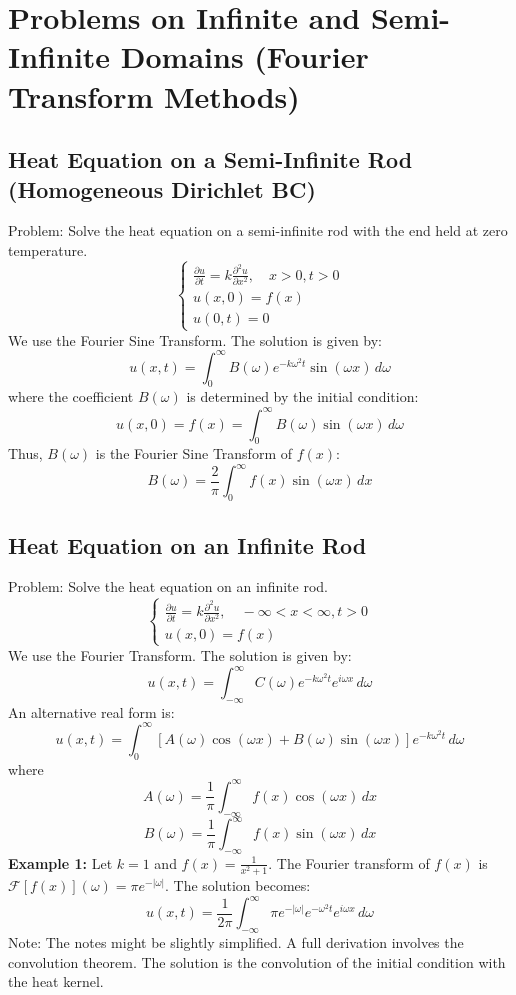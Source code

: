 \documentclass{article}
\begin{document}
	\section{Problems on Infinite and Semi-Infinite Domains (Fourier Transform Methods)}
	
	\subsection{Heat Equation on a Semi-Infinite Rod (Homogeneous Dirichlet BC)}
	Problem: Solve the heat equation on a semi-infinite rod with the end held at zero temperature.
	$$
	\begin{cases}
		\frac{\partial u}{\partial t} = k \frac{\partial^2 u}{\partial x^2}, \quad x > 0, t > 0 \\
		u(x,0) = f(x) \\
		u(0,t) = 0
	\end{cases}
	$$
	We use the Fourier Sine Transform. The solution is given by:
	$$
	u(x,t) = \int_0^\infty B(\omega) e^{-k\omega^2 t} \sin(\omega x) \,d\omega
	$$
	where the coefficient $B(\omega)$ is determined by the initial condition:
	$$
	u(x,0) = f(x) = \int_0^\infty B(\omega) \sin(\omega x) \,d\omega
	$$
	Thus, $B(\omega)$ is the Fourier Sine Transform of $f(x)$:
	$$
	B(\omega) = \frac{2}{\pi} \int_0^\infty f(x) \sin(\omega x) \,dx
	$$
	
	\subsection{Heat Equation on an Infinite Rod}
	Problem: Solve the heat equation on an infinite rod.
	$$
	\begin{cases}
		\frac{\partial u}{\partial t} = k \frac{\partial^2 u}{\partial x^2}, \quad -\infty < x < \infty, t > 0 \\
		u(x,0) = f(x)
	\end{cases}
	$$
	We use the Fourier Transform. The solution is given by:
	$$
	u(x,t) = \int_{-\infty}^\infty C(\omega) e^{-k\omega^2 t} e^{i\omega x} \,d\omega
	$$
	An alternative real form is:
	$$
	u(x,t) = \int_0^\infty [A(\omega)\cos(\omega x) + B(\omega)\sin(\omega x)]e^{-k\omega^2 t} \,d\omega
	$$
	where
	$$
	A(\omega) = \frac{1}{\pi} \int_{-\infty}^\infty f(x)\cos(\omega x)\,dx
	$$
	$$
	B(\omega) = \frac{1}{\pi} \int_{-\infty}^\infty f(x)\sin(\omega x)\,dx
	$$
	\textbf{Example 1:} Let $k=1$ and $f(x) = \frac{1}{x^2+1}$.
	The Fourier transform of $f(x)$ is $\mathcal{F}[f(x)](\omega) = \pi e^{-|\omega|}$. The solution becomes:
	$$
	u(x,t) = \frac{1}{2\pi} \int_{-\infty}^\infty \pi e^{-|\omega|} e^{- \omega^2 t} e^{i\omega x} \,d\omega
	$$
	Note: The notes might be slightly simplified. A full derivation involves the convolution theorem. The solution is the convolution of the initial condition with the heat kernel.
	
\end{document}
